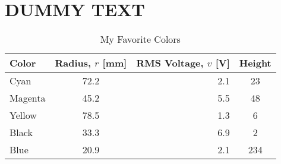 \clearpage
\chapter{DUMMY TEXT}
\doublespacing

\begin{table}[h]
	\centering
	\caption{My Favorite Colors}
	\begin{tabular}{l c r c}
		\hline
		Color	&  Radius, $r$ [mm] & RMS Voltage, $v$ [V] & Height \\
		\hline
		Cyan	&	72.2	&	2.1 & 23  \\
		Magenta	&	45.2	&	5.5 & 48 \\
		Yellow	&	78.5	&	1.3  & 6 \\
		Black	&	33.3	&	6.9  & 2 \\
		Blue    &   20.9    &   2.1  & 234 \\
		\hline
	\end{tabular}
	\label{tab:exampleTable2}
\end{table}

